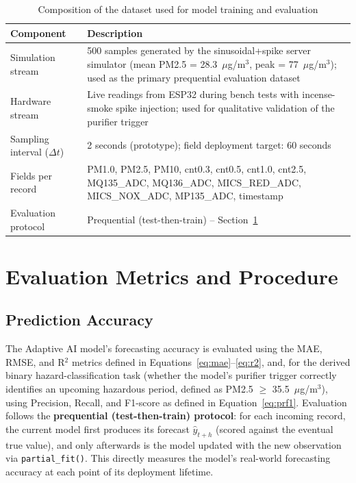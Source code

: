 \begin{table}[htbp]
\centering
\caption{Composition of the dataset used for model training and evaluation}
\label{tab:exp-dataset}
\begin{tabular}{@{}p{5cm}p{8cm}@{}}
\toprule
\textbf{Component} & \textbf{Description} \\
\midrule
Simulation stream & 500 samples generated by the sinusoidal+spike server simulator (mean PM2.5 = 28.3~$\mu$g/m$^3$, peak = 77~$\mu$g/m$^3$); used as the primary prequential evaluation dataset \\
Hardware stream & Live readings from ESP32 during bench tests with incense-smoke spike injection; used for qualitative validation of the purifier trigger \\
Sampling interval ($\Delta t$) & 2 seconds (prototype); field deployment target: 60 seconds \\
Fields per record & PM1.0, PM2.5, PM10, cnt0.3, cnt0.5, cnt1.0, cnt2.5, MQ135\_ADC, MQ136\_ADC, MICS\_RED\_ADC, MICS\_NOX\_ADC, MP135\_ADC, timestamp \\
Evaluation protocol & Prequential (test-then-train) -- Section~\ref{sec:exp-metrics-procedure} \\
\bottomrule
\end{tabular}
\end{table}

\section{Evaluation Metrics and Procedure}
\label{sec:exp-metrics-procedure}

\subsection{Prediction Accuracy}
The Adaptive AI model's forecasting accuracy is evaluated using the MAE, RMSE, and R$^2$ metrics defined in Equations~\ref{eq:mae}--\ref{eq:r2}, and, for the derived binary hazard-classification task (whether the model's purifier trigger correctly identifies an upcoming hazardous period, defined as PM2.5 $\geq$ 35.5~$\mu$g/m$^3$), using Precision, Recall, and F1-score as defined in Equation~\ref{eq:prf1}. Evaluation follows the \textbf{prequential (test-then-train) protocol}: for each incoming record, the current model first produces its forecast $\hat{y}_{t+h}$ (scored against the eventual true value), and only afterwards is the model updated with the new observation via \texttt{partial\_fit()}. This directly measures the model's real-world forecasting accuracy at each point of its deployment lifetime.

